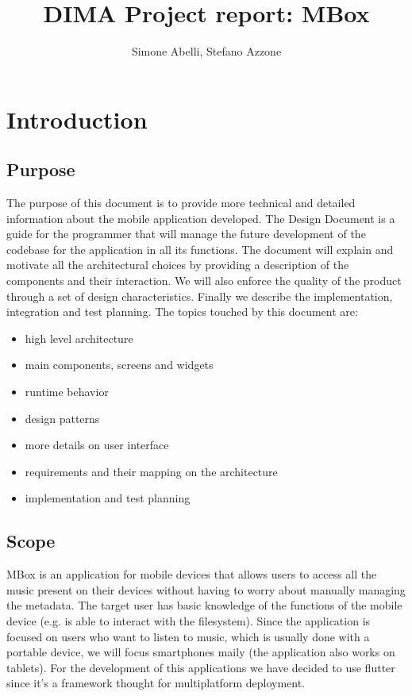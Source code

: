 \documentclass{article}
\author{Simone Abelli, Stefano Azzone}
\title{DIMA Project report: MBox}
\begin{document}
\maketitle
\newpage
\tableofcontents
\newpage
\section{Introduction}
\subsection{Purpose}
The purpose of this document is to provide more technical and detailed
information about the mobile application developed. The Design Document is a
guide for the programmer that will manage the future development of the codebase
for the application in all its functions. The document will explain and motivate
all the architectural choices by providing a description of the components and
their interaction. We will also enforce the quality of the product through a set
of design characteristics. Finally we describe the implementation, integration
and test planning.
The topics touched by this document are:
\begin{itemize}
	\item high level architecture
	\item main components, screens and widgets
	\item runtime behavior
	\item design patterns
	\item more details on user interface
	\item requirements and their mapping on the architecture
	\item implementation and test planning
\end{itemize}

\subsection{Scope}
MBox is an application for mobile devices that allows users to access all the
music present on their devices without having to worry about manually managing 
the metadata. The target user has basic knowledge of the functions of the
mobile device (e.g. is able to interact with the filesystem). Since the
application is focused on users who want to listen to music, which is usually
done with a portable device, we will focus smartphones maily (the application
also works on tablets). For the development of this applications we have decided
to use flutter since it's a framework thought for multiplatform deployment.
\end{document}
